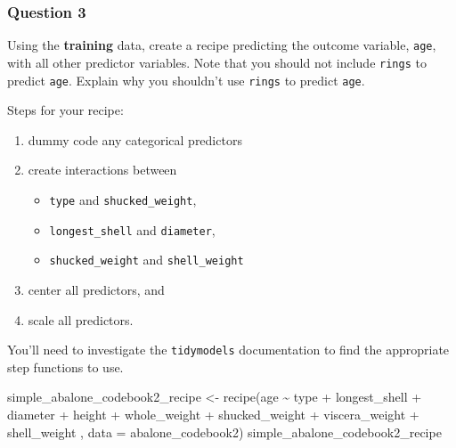 \documentclass[
]{article}
\newenvironment{Shaded}{\begin{snugshade}}{\end{snugshade}}
\newcommand{\AttributeTok}[1]{\textcolor[rgb]{0.77,0.63,0.00}{#1}}
\newcommand{\FunctionTok}[1]{\textcolor[rgb]{0.00,0.00,0.00}{#1}}
\newcommand{\NormalTok}[1]{#1}
\newcommand{\OtherTok}[1]{\textcolor[rgb]{0.56,0.35,0.01}{#1}}
\newcommand{\SpecialCharTok}[1]{\textcolor[rgb]{0.00,0.00,0.00}{#1}}
\providecommand{\tightlist}{%
  \setlength{\itemsep}{0pt}\setlength{\parskip}{0pt}}
\begin{document}
\hypertarget{question-3}{%
\subsubsection{Question 3}\label{question-3}}

Using the \textbf{training} data, create a recipe predicting the outcome
variable, \texttt{age}, with all other predictor variables. Note that
you should not include \texttt{rings} to predict \texttt{age}. Explain
why you shouldn't use \texttt{rings} to predict \texttt{age}.

Steps for your recipe:

\begin{enumerate}
\def\labelenumi{\arabic{enumi}.}
\item
  dummy code any categorical predictors
\item
  create interactions between

  \begin{itemize}
  \tightlist
  \item
    \texttt{type} and \texttt{shucked\_weight},
  \item
    \texttt{longest\_shell} and \texttt{diameter},
  \item
    \texttt{shucked\_weight} and \texttt{shell\_weight}
  \end{itemize}
\item
  center all predictors, and
\item
  scale all predictors.
\end{enumerate}

You'll need to investigate the \texttt{tidymodels} documentation to find
the appropriate step functions to use.

\begin{Shaded}
\begin{Highlighting}[]
\NormalTok{simple\_abalone\_codebook2\_recipe }\OtherTok{\textless{}{-}} \FunctionTok{recipe}\NormalTok{(age }\SpecialCharTok{\textasciitilde{}}\NormalTok{ type }\SpecialCharTok{+}\NormalTok{ longest\_shell }\SpecialCharTok{+}\NormalTok{ diameter }\SpecialCharTok{+}\NormalTok{ height }\SpecialCharTok{+}\NormalTok{ whole\_weight }\SpecialCharTok{+}\NormalTok{ shucked\_weight }\SpecialCharTok{+}\NormalTok{ viscera\_weight }\SpecialCharTok{+}\NormalTok{ shell\_weight , }\AttributeTok{data =}\NormalTok{ abalone\_codebook2)}
\NormalTok{simple\_abalone\_codebook2\_recipe}
\end{Highlighting}
\end{Shaded}
\end{document}
